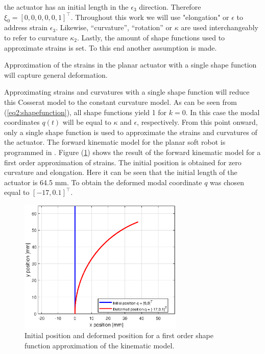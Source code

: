 the actuator has an initial length in the $\epsilon_3$ direction. Therefore $\xi_0 = [0,0,0,0,0,1]^\top$. Throughout this work we will use "elongation" or $\epsilon$ to address strain $\epsilon_3$. Likewise, ``curvature'', ``rotation'' or  $\kappa$ are used interchangeably to refer to curvature $\kappa_2$. Lastly, the amount of shape functions used to approximate strains is set. To this end another assumption is made.

\begin{theorem}
Approximation of the strains in the planar actuator with a single shape function will capture general deformation.  
\end{theorem}

Approximating strains and curvatures with a single shape function will reduce this Cosserat model to the constant curvature model. As can be seen from (\ref{eq2:shapefunction}), all shape functions yield 1 for $k=0$. In this case the modal coordinates $q(t)$ will be equal to $\kappa$ and $\epsilon$, respectively. 
From this point onward, only a single shape function is used to approximate the strains and curvatures of the actuator. The forward kinematic model for the planar soft robot is programmed in \MATLAB \cite{MATLAB2020}. Figure (\ref{fig1:forward_kinematic}) shows the result of the forward kinematic model for a first order approximation of strains. The initial position is obtained for zero curvature and elongation. Here it can be seen that the initial length of the actuator is 64.5 mm. To obtain the deformed modal coordinate $q$ was chosen equal to $[-17,0.1]^\top$. 



\begin{figure}[H]
    \centering
    \includegraphics[width = 0.7\textwidth]{Figures/Chapter2/fkin1701.eps}
    \caption{Initial position and deformed position for a first order shape function approximation of the kinematic model.}
    \label{fig1:forward_kinematic}
\end{figure}

